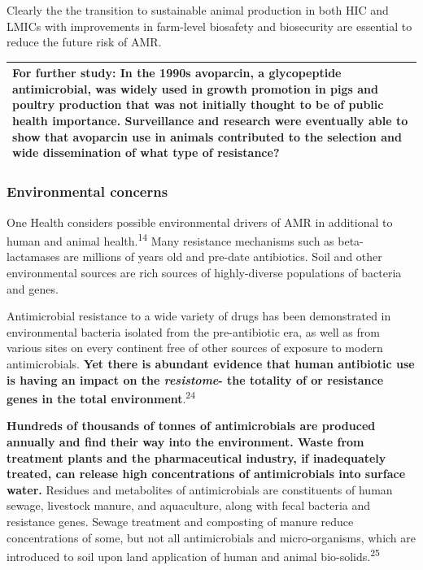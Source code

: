 \documentclass[
  11pt,
  paper=a4,
  ,captions=tableheading
]{scrartcl}
\begin{document}
Clearly the the transition to sustainable animal production in both HIC
and LMICs with improvements in farm-level biosafety and biosecurity are
essential to reduce the future risk of AMR.

\begin{longtable}[]{@{}
  >{\raggedright\arraybackslash}p{}@{}}
\toprule
\endhead
\textbf{For further study:} In the 1990s avoparcin, a glycopeptide
antimicrobial, was widely used in growth promotion in pigs and poultry
production that was not initially thought to be of public health
importance. Surveillance and research were eventually able to show that
avoparcin use in animals contributed to the selection and wide
dissemination of what type of resistance? \\
\bottomrule
\end{longtable}

\hypertarget{environmental-concerns}{%
\subsubsection*{Environmental concerns}\label{environmental-concerns}}

One Health considers possible environmental drivers of AMR in additional
to human and animal health.\textsuperscript{14} Many resistance
mechanisms such as beta-lactamases are millions of years old and
pre-date antibiotics. Soil and other environmental sources are rich
sources of highly-diverse populations of bacteria and genes.

Antimicrobial resistance to a wide variety of drugs has been
demonstrated in environmental bacteria isolated from the pre-antibiotic
era, as well as from various sites on every continent free of other
sources of exposure to modern antimicrobials. \textbf{Yet there is
abundant evidence that human antibiotic use is having an impact on the
\emph{resistome}- the totality of or resistance genes in the total
environment}.\textsuperscript{24}

\textbf{Hundreds of thousands of tonnes of antimicrobials are produced
annually and find their way into the environment. Waste from treatment
plants and the pharmaceutical industry, if inadequately treated, can
release high concentrations of antimicrobials into surface water.}
Residues and metabolites of antimicrobials are constituents of human
sewage, livestock manure, and aquaculture, along with fecal bacteria and
resistance genes. Sewage treatment and composting of manure reduce
concentrations of some, but not all antimicrobials and micro-organisms,
which are introduced to soil upon land application of human and animal
bio-solids.\textsuperscript{25}
\end{document}
